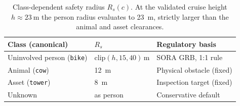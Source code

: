 \begin{table}[t]
    \centering
    \small
    \begin{tabular}{@{}l l l@{}}
        \toprule
        \textbf{Class (canonical)} & \textbf{$R_s$} & \textbf{Regulatory basis} \\
        \midrule
        Uninvolved person (\texttt{bike}) & $\mathrm{clip}(h,15,40)\,\si{\meter}$ & SORA GRB, 1:1 rule \\
        Animal (\texttt{cow}) & \SI{12}{\meter} & Physical obstacle (fixed) \\
        Asset (\texttt{tower}) & \SI{8}{\meter} & Inspection target (fixed) \\
        Unknown & as person & Conservative default \\
        \bottomrule
    \end{tabular}
    \caption{Class-dependent safety radius $R_s(c)$. At the validated cruise
    height $h\approx\SI{23}{\meter}$ the person radius evaluates to
    \SI{23}{\meter}, strictly larger than the animal and asset clearances.}
    \label{tab:class-radius}
\end{table}

